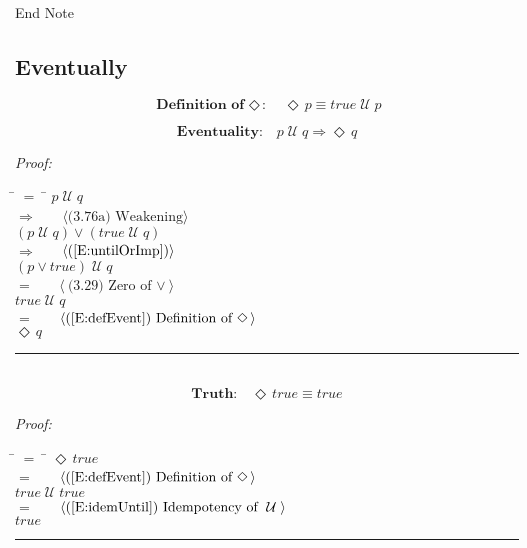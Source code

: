 \documentclass[fleqn, leqno]{article}
\newcommand{\lgap}{2pt}                             %
\newcommand{\mymathindent}{24pt}                    %
\newcommand{\Until}{\;\mathcal{U}\;}
\newcommand{\Event}{\Diamond\,}
\newcommand{\myqed}{\hfill\rule[-.23ex]{1.2ex}{2.0ex}}
\newcommand{\Gll} {\langle}                         %
\newcommand{\Ggg} {\rangle}                         %
\newcommand{\Hint}[1]     {\ \ \ $\Gll              \mbox{#1} \Ggg$ }   %
\begin{document}
End Note\\

\subsection{Eventually}

\begin{equation}\label{E:defEvent}
\textbf{Definition of $\Event$:}\quad \Event p \equiv true \Until p
\end{equation}

\begin{equation}\label{E:eventuality}
\textbf{Eventuality:}\quad p \Until q \Rightarrow \Event q
\end{equation}

\emph{Proof:}
\begin{tabbing}
\hspace{\mymathindent} \= $= \;$ \= \kill
  \> \>   $p \Until q$\\[\lgap]
  \> $\Rightarrow$  \>  \Hint{(3.76a) Weakening}\\[\lgap]
  \> \>   $(p \Until q) \lor (true \Until q)$\\[\lgap]
  \> $\Rightarrow$  \>  \Hint{(\ref{E:untilOrImp})}\\[\lgap]
  \> \>   $(p \lor true) \Until q$\\[\lgap]
  \> $=$  \>  \Hint{(3.29) Zero of $\lor$}\\[\lgap]
  \> \>   $true \Until q$\\[\lgap]
  \> $=$  \>  \Hint{(\ref{E:defEvent}) Definition of $\Event$}\\[\lgap]
  \> \>   $\Event q$\\[\lgap]
\end{tabbing}
\myqed\\[\lgap]


\begin{equation}\label{E:eventTrue}
\textbf{Truth:}\quad \Event true \equiv true
\end{equation}

\emph{Proof:}
\begin{tabbing}
\hspace{\mymathindent} \= $= \;$ \= \kill
  \> \>   $\Event true$\\[\lgap]
  \> $=$  \>  \Hint{(\ref{E:defEvent}) Definition of $\Event$}\\[\lgap]
  \> \>   $true \Until true$\\[\lgap]
  \> $=$  \>  \Hint{(\ref{E:idemUntil}) Idempotency of $\Until$}\\[\lgap]
  \> \>   $true$\\[\lgap]
\end{tabbing}
\myqed\\[\lgap]
\end{document}
